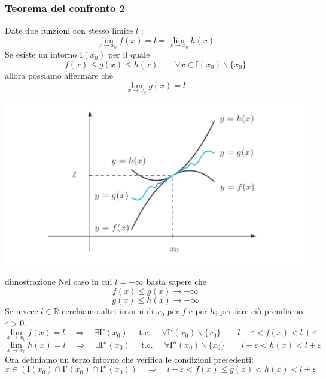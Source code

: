 \documentclass[x11names]{article}
\begin{document}
	\begin{center}
		\colorbox{myred}{\begin{minipage}{5.75in}
				\begin{redes}{}
					\subsubsection{Teorema del confronto 2}
					Date due funzioni con stesso limite $l$ :
					\[
					\lim_{x \to x_0} f(x) = l = \lim_{x \to x_0} h(x)
					\]
					Se esiste un intorno $\text{I}(x_0)$ per il quale 
					\[
					f(x) \leq g(x) \leq h(x) \qquad  \forall x \in \text{I}(x_0) \backslash \{x_0\}
					\]
					allora possiamo affermare che 
					\[
					\lim_{x \to x_0} g(x) = l
					\]
				\end{redes}
		\end{minipage}}        
	\end{center}
	\begin{center}
		\includegraphics[scale=0.3]{figures/confronto2}
	\end{center}
	\begin{es}{dimostrazione}
		Nel caso in cui $l = \pm \infty$ basta sapere che
		\[
		f(x) \leq g(x) \to +\infty
		\]
		\[
		g(x) \leq h(x) \to -\infty
		\]
		Se invece $l \in \mathbb{R}$ cerchiamo altri intorni di $x_0$ per $f$ e per $h$; per fare ciò prendiamo $\varepsilon > 0$.
		\[
		\lim_{x \to x_0} f(x) = l \quad \Longrightarrow \quad \exists \text{I}'(x_0) \quad \text{ t.c. } \quad \forall \text{I}'(x_0) \backslash \{x_0\} \qquad l - \varepsilon < f(x) < l + \varepsilon
		\]
		\[
		\lim_{x \to x_0} h(x) = l \quad \Longrightarrow \quad \exists \text{I}''(x_0) \quad \text{ t.c. } \quad \forall \text{I}''(x_0) \backslash \{x_0\} \qquad l - \varepsilon < h(x) < l + \varepsilon
		\]
		Ora definiamo un terzo intorno che verifica le condizioni precedenti:
		\[
		x \in (\text{I}(x_0) \cap \text{I}'(x_0) \cap \text{I}''(x_0)) \quad \Longrightarrow \quad l - \varepsilon < f(x)\leq g(x) < h(x) < l + \varepsilon
		\]
	\end{es}
\end{document}
